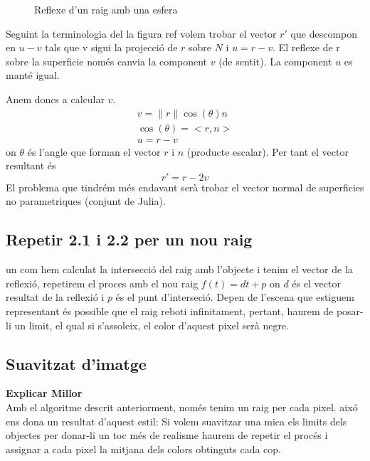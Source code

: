 \documentclass{article}
\begin{document}
\begin{figure}
\begin{tikzpicture}[x=0.75pt,y=0.75pt,yscale=-1.1,xscale=1.1]
\end{tikzpicture}
\label{fig:reflex}
\caption{Reflexe d'un raig amb una esfera}
\end{figure}



Seguint la terminologia del la figura ref %
volem trobar  el vector $r'$ que descompon en $u - v$ tals que v sigui la projecció de $r$ sobre  $N$ i  $u= r-v$.
El reflexe de r sobre la superficie només canvia la component $v$ (de sentit). La component  $u$ es manté igual.


Anem doncs a calcular $v$.
\begin{align} 
   v=\|r\| \cos(\theta)  n \\
   \cos(\theta) = <r , n> \\
   u= r-v
\end{align}
on $\theta$ és l'angle que forman el vector  $r$ i  $n$ (producte escalar).
Per tant el vector resultant és
\begin{equation*}
   r'= r-2v 
\end{equation*}
El problema que tindrém més endavant serà trobar el vector normal de superficies no parametriques (conjunt de Julia).

\subsection{Repetir 2.1 i 2.2 per un nou raig}
un com hem calculat la intersecció del raig amb l'objecte i tenim el vector de la reflexió, repetirem el proces amb el nou raig
$f(t)=dt+p$ on  $d$ és el vector resultat de la reflexió i  $p$ és el punt d'interseció. Depen de l'escena que estiguem
representant és possible que el raig reboti infinitament, pertant, haurem de posar-li un limit, el qual si s'assoleix, el color
d'aquest pixel serà negre.

\subsection{Suavitzat d'imatge}
\textbf{  Explicar Millor} \\

Amb el algoritme descrit anteriorment, només tenim un raig per cada pixel. aixó ens dona un resultat d'aquest estil:
Si volem suavitzar una mica els limits dels objectes per donar-li un toc més de realisme haurem de repetir el procés i assignar a
cada pixel la mitjana dels colors obtinguts cada cop.
\end{document}
